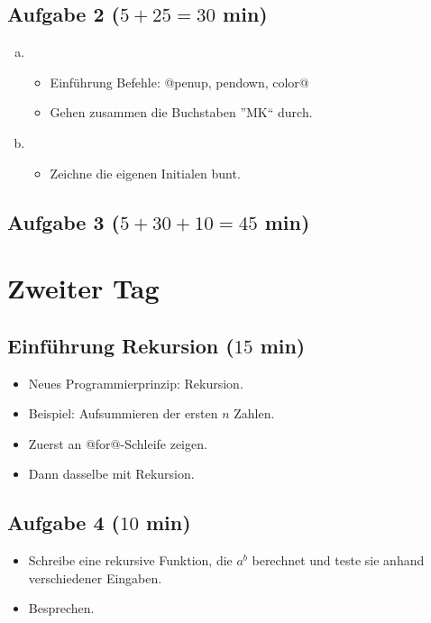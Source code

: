 	\subsection{Aufgabe 2 ($5+25=30$ min)}
	\begin{enumerate}[(a)]
		\item 
		\begin{itemize}
			\item 
			Einführung Befehle: @penup, pendown, color@
			\item
			Gehen zusammen die Buchstaben ''MK`` durch.
		\end{itemize}
		
		\item
		\begin{itemize}
			\item 
			Zeichne die eigenen Initialen bunt.
		\end{itemize}
	\end{enumerate}
		
	
	\subsection{Aufgabe 3 ($5+30 + 10=45$ min)}

	\section{Zweiter Tag}
	
	\subsection{Einführung Rekursion ($15$ min)}
	\begin{itemize}
		\item
		Neues Programmierprinzip: Rekursion.
		\item
		Beispiel: Aufsummieren der ersten $n$ Zahlen.
		\item
		Zuerst an @for@-Schleife zeigen.
		\item
		Dann dasselbe mit Rekursion.
	\end{itemize}

	\subsection{Aufgabe 4 ($10$ min)} 
	\begin{itemize}
		\item
		Schreibe eine rekursive Funktion, die $a^b$ berechnet und teste sie anhand verschiedener Eingaben.
		\item
		Besprechen.
	\end{itemize}

